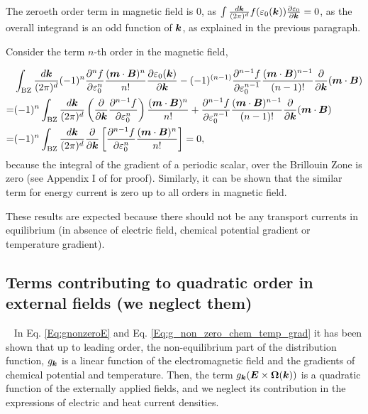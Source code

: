 \documentclass{report}
\renewcommand\vec[1]{\ensuremath\boldsymbol{#1}} %
\begin{document}
The zeroeth order term in magnetic field is 0, as $\int \frac{d\vec{k}}{(2\pi)^d} f(\varepsilon_0(\vec{k})) \frac{\partial \varepsilon_0} {\partial \vec{k}} = 0$, as the overall integrand is an odd function of $\vec{k}$, as explained in the previous paragraph.
	
Consider the term $n$-th order in the magnetic field,

$$
\begin{aligned}
	& \int_{\text{BZ}} \frac{d\vec{k}}{(2\pi)^d} (-1)^{n} \frac{\partial^{n} f}{\partial \varepsilon_{0}^{n}} \frac{(\vec{m} \cdot \vec{B})^n}{n !}\frac{\partial \varepsilon_0 (\vec{k})}{\partial \vec{k}} - (-1)^{(n-1)}  \frac{\partial^{n-1} f}{\partial \varepsilon_{0}^{n-1}} \frac{(\vec{m} \cdot \vec{B})^{n-1}}{(n-1) !} \frac{\partial }{\partial \vec{k}}(\vec{m}\cdot\vec{B}) \\
	= & (-1)^n \int_{\text{BZ}} \frac{d\vec{k}}{(2\pi)^d} \left(\frac{\partial}{\partial \vec{k}}\frac{\partial^{n-1} f}{\partial \varepsilon_{0}^n}\right) \frac{(\vec{m} \cdot \vec{B})^n}{n !} + \frac{\partial^{n-1} f}{\partial \varepsilon_{0}^{n-1}} \frac{(\vec{m} \cdot \vec{B})^{n-1}}{(n-1) !} \frac{\partial }{\partial \vec{k}}(\vec{m}\cdot\vec{B}) \\
	= & (-1)^n \int_{\text{BZ}} \frac{d\vec{k}}{(2\pi)^d} \frac{\partial}{\partial \vec{k}} \left[\frac{\partial^{n-1} f}{\partial \varepsilon_{0}^n} \frac{(\vec{m} \cdot \vec{B})^n}{n !}\right] = 0 ,
\end{aligned}
$$
because the integral of the gradient of a periodic scalar, over the Brillouin Zone is zero (see Appendix I of \cite{book:AshcroftMermin76} for proof).
Similarly, it can be shown that the similar term for energy current is zero up to all orders in magnetic field.

These results are expected because there should not be any transport currents in equilibrium (in absence of electric field, chemical potential gradient or temperature gradient).
\subsection{Terms contributing to quadratic order  in external fields (we neglect them)}~\label{sec:quadCont}
In Eq. \eqref{Eq:gnonzeroE} and Eq. \eqref{Eq:g_non_zero_chem_temp_grad} it has been shown that up to leading order, the non-equilibrium part of the distribution function, ${g}_{\vec{k}}$ is a linear function of the electromagnetic field and the gradients of chemical potential and temperature. Then, the term ${g}_{\vec{k}} (\vec{E}\times\vec{\Omega}(\vec{k}))$ is a quadratic function of the externally applied fields, and we neglect its contribution in the expressions of electric and heat current densities.
\end{document}
